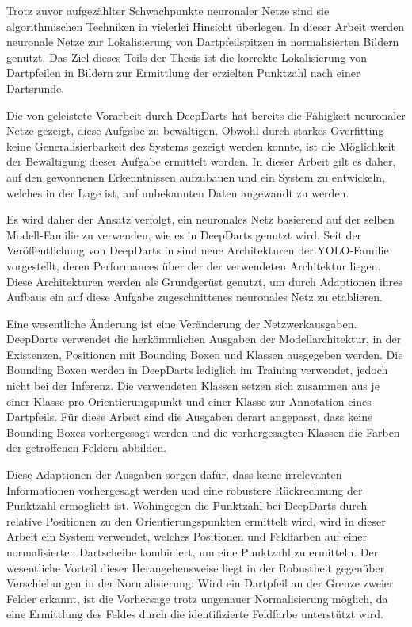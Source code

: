 Trotz zuvor aufgezählter Schwachpunkte neuronaler Netze sind sie algorithmischen Techniken in vielerlei Hinsicht überlegen. In dieser Arbeit werden neuronale Netze zur Lokalisierung von Dartpfeilspitzen in normalisierten Bildern genutzt. Das Ziel dieses Teils der Thesis ist die korrekte Lokalisierung von Dartpfeilen in Bildern zur Ermittlung der erzielten Punktzahl nach einer Dartsrunde.

Die von \citeauthor{deepdarts} geleistete Vorarbeit durch DeepDarts hat bereits die Fähigkeit neuronaler Netze gezeigt, diese Aufgabe zu bewältigen. Obwohl durch starkes Overfitting keine Generalisierbarkeit des Systems gezeigt werden konnte, ist die Möglichkeit der Bewältigung dieser Aufgabe ermittelt worden. In dieser Arbeit gilt es daher, auf den gewonnenen Erkenntnissen aufzubauen und ein System zu entwickeln, welches in der Lage ist, auf unbekannten Daten angewandt zu werden.

Es wird daher der Ansatz verfolgt, ein neuronales Netz basierend auf der selben Modell-Familie zu verwenden, wie es in DeepDarts genutzt wird. Seit der Veröffentlichung von DeepDarts in \citeyear{deepdarts} sind neue Architekturen der YOLO-Familie vorgestellt, deren Performances über der der verwendeten Architektur liegen. Diese Architekturen werden als Grundgerüst genutzt, um durch Adaptionen ihres Aufbaus ein auf diese Aufgabe zugeschnittenes neuronales Netz zu etablieren.

Eine wesentliche Änderung ist eine Veränderung der Netzwerkausgaben. DeepDarts verwendet die herkömmlichen Ausgaben der Modellarchitektur, in der Existenzen, Positionen mit Bounding Boxen und Klassen ausgegeben werden. Die Bounding Boxen werden in DeepDarts lediglich im Training verwendet, jedoch nicht bei der Inferenz. Die verwendeten Klassen setzen sich zusammen aus je einer Klasse pro Orientierungspunkt und einer Klasse zur Annotation eines Dartpfeils. Für diese Arbeit sind die Ausgaben derart angepasst, dass keine Bounding Boxes vorhergesagt werden und die vorhergesagten Klassen die Farben der getroffenen Feldern abbilden.

Diese Adaptionen der Ausgaben sorgen dafür, dass keine irrelevanten Informationen vorhergesagt werden und eine robustere Rückrechnung der Punktzahl ermöglicht ist. Wohingegen die Punktzahl bei DeepDarts durch relative Positionen zu den Orientierungspunkten ermittelt wird, wird in dieser Arbeit ein System verwendet, welches Positionen und Feldfarben auf einer normalisierten Dartscheibe kombiniert, um eine Punktzahl zu ermitteln. Der wesentliche Vorteil dieser Herangehensweise liegt in der Robustheit gegenüber Verschiebungen in der Normalisierung: Wird ein Dartpfeil an der Grenze zweier Felder erkannt, ist die Vorhersage trotz ungenauer Normalisierung möglich, da eine Ermittlung des Feldes durch die identifizierte Feldfarbe unterstützt wird.

